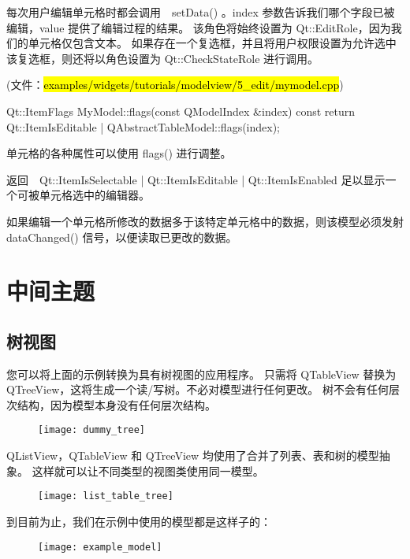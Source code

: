 每次用户编辑单元格时都会调用　setData() 。index 参数告诉我们哪个字段已被编辑，value 提供了编辑过程的结果。
该角色将始终设置为 Qt::EditRole，因为我们的单元格仅包含文本。
如果存在一个复选框，并且将用户权限设置为允许选中该复选框，则还将以角色设置为 Qt::CheckStateRole 进行调用。

(文件：\hl{examples/widgets/tutorials/modelview/5\_edit/mymodel.cpp})

\begin{cppcode}
Qt::ItemFlags MyModel::flags(const QModelIndex &index) const
{
    return Qt::ItemIsEditable | QAbstractTableModel::flags(index);
}
\end{cppcode}

单元格的各种属性可以使用 flags() 进行调整。

返回　Qt::ItemIsSelectable | Qt::ItemIsEditable | Qt::ItemIsEnabled 足以显示一个可被单元格选中的编辑器。

如果编辑一个单元格所修改的数据多于该特定单元格中的数据，则该模型必须发射　dataChanged() 信号，以便读取已更改的数据。

\section{中间主题}

\subsection{树视图}

您可以将上面的示例转换为具有树视图的应用程序。
只需将 QTableView 替换为 QTreeView，这将生成一个读/写树。不必对模型进行任何更改。
树不会有任何层次结构，因为模型本身没有任何层次结构。

\begin{figure}[hbt!]  
\texttt{[image: dummy\_tree]}
\end{figure}


QListView，QTableView 和 QTreeView 均使用了合并了列表、表和树的模型抽象。
这样就可以让不同类型的视图类使用同一模型。

\begin{figure}[hbt!]  
\texttt{[image: list\_table\_tree]}
\end{figure}

到目前为止，我们在示例中使用的模型都是这样子的：

\begin{figure}[hbt!]  
\texttt{[image: example\_model]}
\end{figure}

